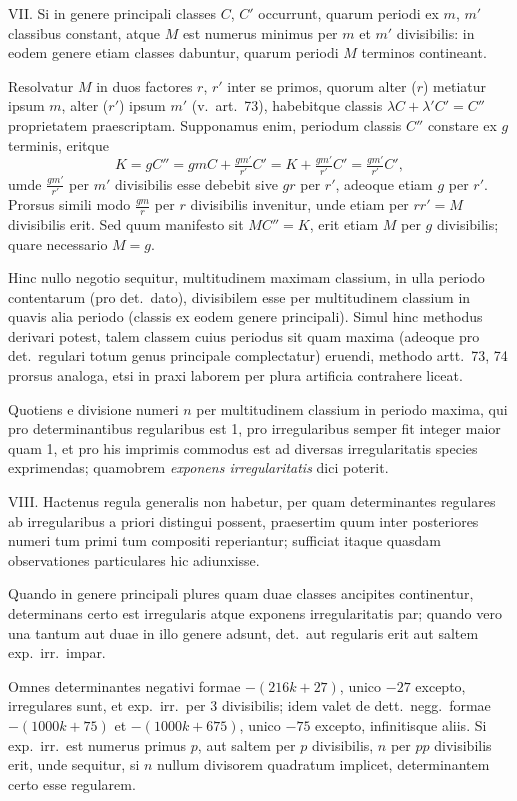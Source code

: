 \documentclass[12pt,a4paper]{article}
\theoremstyle{plain}
\theoremstyle{definition}
\theoremstyle{remark}
\begin{document}
\textsc{VII.} Si in genere principali classes $C$, $C'$ occurrunt, quarum periodi ex $m$, $m'$ classibus constant, atque $M$ est numerus minimus per $m$ et $m'$ divisibilis: in eodem genere etiam classes dabuntur, quarum periodi $M$ terminos contineant.

Resolvatur $M$ in duos factores $r$, $r'$ inter se primos, quorum alter ($r$) metiatur ipsum $m$, alter ($r'$) ipsum $m'$ (v.~art.~73), habebitque classis $\lambda C + \lambda' C' = C''$ proprietatem praescriptam. Supponamus enim, periodum classis $C''$ constare ex $g$ terminis, eritque
\[
K = gC'' = gmC + \tfrac{gm'}{r'}C' = K + \tfrac{gm'}{r'}C' = \tfrac{gm'}{r'}C',
\]
umde $\tfrac{gm'}{r'}$ per $m'$ divisibilis esse debebit sive $gr$ per $r'$, adeoque etiam $g$ per $r'$. Prorsus simili modo $\tfrac{gm}{r}$ per $r$ divisibilis invenitur, unde etiam per $rr' = M$ divisibilis erit. Sed quum manifesto sit $MC'' = K$, erit etiam $M$ per $g$ divisibilis; quare necessario $M = g$.

Hinc nullo negotio sequitur, multitudinem maximam classium, in ulla periodo contentarum (pro det.~dato), divisibilem esse per multitudinem classium in quavis alia periodo (classis ex eodem genere principali). Simul hinc methodus derivari potest, talem classem cuius periodus sit quam maxima (adeoque pro det.~regulari totum genus principale complectatur) eruendi, methodo artt.~73, 74 prorsus analoga, etsi in praxi laborem per plura artificia contrahere liceat.

Quotiens e divisione numeri $n$ per multitudinem classium in periodo maxima, qui pro determinantibus regularibus est 1, pro irregularibus semper fit integer maior quam 1, et pro his imprimis commodus est ad diversas irregularitatis species exprimendas; quamobrem \textit{exponens irregularitatis} dici poterit.

\textsc{VIII.} Hactenus regula generalis non habetur, per quam determinantes regulares ab irregularibus a priori distingui possent, praesertim quum inter posteriores numeri tum primi tum compositi reperiantur; sufficiat itaque quasdam observationes particulares hic adiunxisse.

Quando in genere principali plures quam duae classes ancipites continentur, determinans certo est irregularis atque exponens irregularitatis par; quando vero una tantum aut duae in illo genere adsunt, det.~aut regularis erit aut saltem exp.~irr.~impar.

Omnes determinantes negativi formae $-(216k + 27)$, unico $-27$ excepto, irregulares sunt, et exp.~irr.~per 3 divisibilis; idem valet de dett.~negg.~formae $-(1000k + 75)$ et $-(1000k + 675)$, unico $-75$ excepto, infinitisque aliis. Si exp.~irr.~est numerus primus $p$, aut saltem per $p$ divisibilis, $n$ per $pp$ divisibilis erit, unde sequitur, si $n$ nullum divisorem quadratum implicet, determinantem certo esse regularem.
\end{document}
